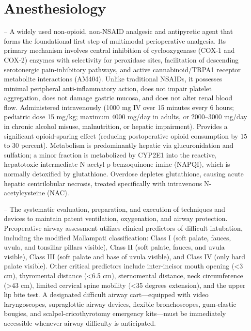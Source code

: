 \chapter{Anesthesiology}

-- A widely used non-opioid, non-NSAID analgesic and antipyretic agent that forms the foundational first step of multimodal perioperative analgesia. Its primary mechanism involves central inhibition of cyclooxygenase (COX-1 and COX-2) enzymes with selectivity for peroxidase sites, facilitation of descending serotonergic pain-inhibitory pathways, and active cannabinoid/TRPA1 receptor metabolite interactions (AM404). Unlike traditional NSAIDs, it possesses minimal peripheral anti-inflammatory action, does not impair platelet aggregation, does not damage gastric mucosa, and does not alter renal blood flow. Administered intravenously (1000 mg IV over 15 minutes every 6 hours; pediatric dose 15 mg/kg; maximum 4000 mg/day in adults, or 2000--3000 mg/day in chronic alcohol misuse, malnutrition, or hepatic impairment). Provides a significant opioid-sparing effect (reducing postoperative opioid consumption by 15 to 30 percent). Metabolism is predominantly hepatic via glucuronidation and sulfation; a minor fraction is metabolized by CYP2E1 into the reactive, hepatotoxic intermediate N-acetyl-p-benzoquinone imine (NAPQI), which is normally detoxified by glutathione. Overdose depletes glutathione, causing acute hepatic centrilobular necrosis, treated specifically with intravenous N-acetylcysteine (NAC).

-- The systematic evaluation, preparation, and execution of techniques and devices to maintain patent ventilation, oxygenation, and airway protection. Preoperative airway assessment utilizes clinical predictors of difficult intubation, including the modified Mallampati classification: Class I (soft palate, fauces, uvula, and tonsillar pillars visible), Class II (soft palate, fauces, and uvula visible), Class III (soft palate and base of uvula visible), and Class IV (only hard palate visible). Other critical predictors include inter-incisor mouth opening (<3 cm), thyromental distance (<6.5 cm), sternomental distance, neck circumference (>43 cm), limited cervical spine mobility (<35 degrees extension), and the upper lip bite test. A designated difficult airway cart—equipped with video laryngoscopes, supraglottic airway devices, flexible bronchoscopes, gum-elastic bougies, and scalpel-cricothyrotomy emergency kits—must be immediately accessible whenever airway difficulty is anticipated.

